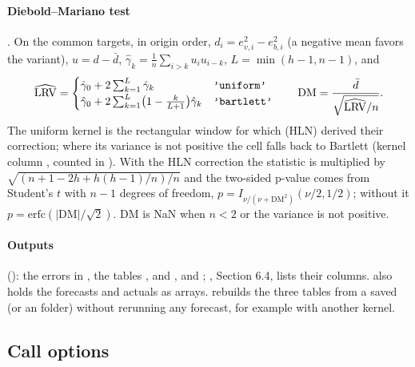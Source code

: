 \documentclass[11pt,a4paper]{article}
\DeclareRobustCommand{\codem}[1]{\texttt{\detokenize{#1}}}
\begin{document}
\paragraph{Diebold--Mariano test} \citep{diebold1995}. On the common targets, in origin order,
$d_i = e_{v,i}^2 - e_{b,i}^2$ (a negative mean favors the variant), $u = d - \bar d$,
$\hat\gamma_k = \frac1n\sum_{i>k}u_iu_{i-k}$, $L = \min(h-1, n-1)$, and
\begin{equation}\label{eq:dm}
  \widehat{\mathrm{LRV}} =
  \begin{cases}
    \hat\gamma_0 + 2\sum_{k=1}^{L}\hat\gamma_k & \text{\codem{'uniform'}}\\
    \hat\gamma_0 + 2\sum_{k=1}^{L}\bigl(1 - \tfrac{k}{L+1}\bigr)\hat\gamma_k & \text{\codem{'bartlett'}}
  \end{cases}
  \qquad
  \mathrm{DM} = \frac{\bar d}{\sqrt{\widehat{\mathrm{LRV}}/n}} .
\end{equation}
The uniform kernel is the rectangular window for which \citet{harvey1997} (HLN) derived their correction;
where its variance is not positive the cell falls back to Bartlett \citep{newey1987} (kernel column
, counted in ). With the HLN correction the
statistic is multiplied by $\sqrt{(n + 1 - 2h + h(h-1)/n)/n}$ and the two-sided p-value comes from
Student's $t$ with $n-1$ degrees of freedom, $p = I_{\nu/(\nu+\mathrm{DM}^2)}(\nu/2, 1/2)$; without it
$p = \mathrm{erfc}(|\mathrm{DM}|/\sqrt2)$. DM is NaN when $n<2$ or the variance is not positive.

\paragraph{Outputs} (): the errors in , the
tables ,  and , and ;
, Section 6.4, lists their columns.  also holds the forecasts and
actuals as arrays.  rebuilds the three tables from a saved
 (or an  folder) without rerunning any forecast, for example
with another kernel.

\subsection{Call options}
\end{document}
